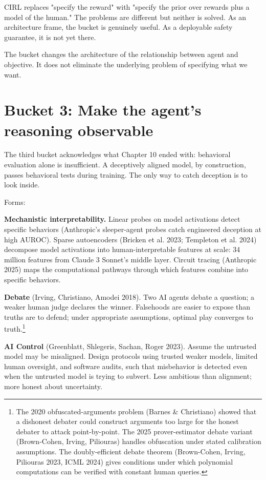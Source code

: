 CIRL replaces "specify the reward" with "specify the prior over rewards plus a model of the human." The problems are different but neither is solved. As an architecture frame, the bucket is genuinely useful. As a deployable safety guarantee, it is not yet there.

The bucket changes the architecture of the relationship between agent and objective. It does not eliminate the underlying problem of specifying what we want.

\section*{Bucket 3: Make the agent's reasoning observable}

The third bucket acknowledges what Chapter 10 ended with: behavioral evaluation alone is insufficient. A deceptively aligned model, by construction, passes behavioral tests during training. The only way to catch deception is to look inside.

Forms:

\textbf{Mechanistic interpretability.} Linear probes on model activations detect specific behaviors (Anthropic's sleeper-agent probes catch engineered deception at high AUROC). Sparse autoencoders (Bricken et al. 2023; Templeton et al. 2024) decompose model activations into human-interpretable features at scale: 34 million features from Claude 3 Sonnet's middle layer. Circuit tracing (Anthropic 2025) maps the computational pathways through which features combine into specific behaviors.

\textbf{Debate} (Irving, Christiano, Amodei 2018). Two AI agents debate a question; a weaker human judge declares the winner. Falsehoods are easier to expose than truths are to defend; under appropriate assumptions, optimal play converges to truth.\footnote{The 2020 obfuscated-arguments problem (Barnes \& Christiano) showed that a dishonest debater could construct arguments too large for the honest debater to attack point-by-point. The 2025 prover-estimator debate variant (Brown-Cohen, Irving, Piliouras) handles obfuscation under stated calibration assumptions. The doubly-efficient debate theorem (Brown-Cohen, Irving, Piliouras 2023, ICML 2024) gives conditions under which polynomial computations can be verified with constant human queries.}

\textbf{AI Control} (Greenblatt, Shlegeris, Sachan, Roger 2023). Assume the untrusted model may be misaligned. Design protocols using trusted weaker models, limited human oversight, and software audits, such that misbehavior is detected even when the untrusted model is trying to subvert. Less ambitious than alignment; more honest about uncertainty.

